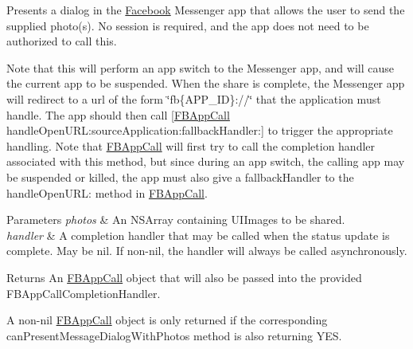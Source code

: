 Presents a dialog in the \hyperlink{interfaceFacebook}{Facebook} Messenger app that allows the user to send the supplied photo(s). No session is required, and the app does not need to be authorized to call this.

Note that this will perform an app switch to the Messenger app, and will cause the current app to be suspended. When the share is complete, the Messenger app will redirect to a url of the form \char`\"{}fb\{\+A\+P\+P\+\_\+\+I\+D\}\+://\char`\"{} that the application must handle. The app should then call \mbox{[}\hyperlink{interfaceFBAppCall}{F\+B\+App\+Call} handle\+Open\+U\+R\+L\+:source\+Application\+:fallback\+Handler\+:\mbox{]} to trigger the appropriate handling. Note that \hyperlink{interfaceFBAppCall}{F\+B\+App\+Call} will first try to call the completion handler associated with this method, but since during an app switch, the calling app may be suspended or killed, the app must also give a fallback\+Handler to the handle\+Open\+U\+RL\+: method in \hyperlink{interfaceFBAppCall}{F\+B\+App\+Call}.


\begin{DoxyParams}{Parameters}
{\em photos} & An N\+S\+Array containing U\+I\+Images to be shared.\\
\hline
{\em handler} & A completion handler that may be called when the status update is complete. May be nil. If non-\/nil, the handler will always be called asynchronously.\\
\hline
\end{DoxyParams}
\begin{DoxyReturn}{Returns}
An \hyperlink{interfaceFBAppCall}{F\+B\+App\+Call} object that will also be passed into the provided F\+B\+App\+Call\+Completion\+Handler.
\end{DoxyReturn}
A non-\/nil \hyperlink{interfaceFBAppCall}{F\+B\+App\+Call} object is only returned if the corresponding {\ttfamily can\+Present\+Message\+Dialog\+With\+Photos} method is also returning Y\+ES. \mbox{\label{interfaceFBDialogs_a872dc61b3ce463fea47eec224f8fb635}} 
